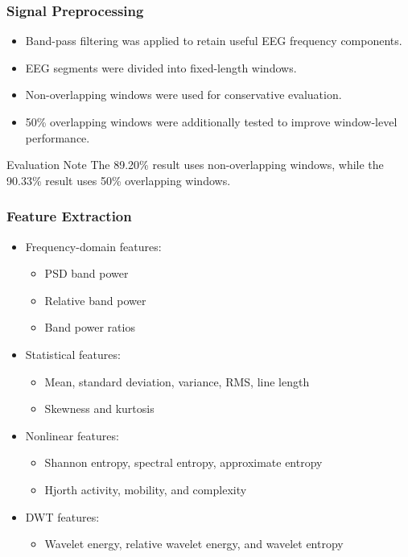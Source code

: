 \documentclass{beamer}
\begin{document}
\begin{frame}
\frametitle{Signal Preprocessing}
\begin{itemize}
\item Band-pass filtering was applied to retain useful EEG frequency components.
\item EEG segments were divided into fixed-length windows.
\item Non-overlapping windows were used for conservative evaluation.
\item 50\% overlapping windows were additionally tested to improve window-level performance.
\end{itemize}

\vspace{0.2cm}
\begin{block}{Evaluation Note}
The 89.20\% result uses non-overlapping windows, while the 90.33\% result uses 50\% overlapping windows.
\end{block}
\end{frame}

\begin{frame}
\frametitle{Feature Extraction}
\begin{itemize}
\item Frequency-domain features:
\begin{itemize}
\item PSD band power
\item Relative band power
\item Band power ratios
\end{itemize}
\item Statistical features:
\begin{itemize}
\item Mean, standard deviation, variance, RMS, line length
\item Skewness and kurtosis
\end{itemize}
\item Nonlinear features:
\begin{itemize}
\item Shannon entropy, spectral entropy, approximate entropy
\item Hjorth activity, mobility, and complexity
\end{itemize}
\item DWT features:
\begin{itemize}
\item Wavelet energy, relative wavelet energy, and wavelet entropy
\end{itemize}
\end{itemize}
\end{frame}
\end{document}
